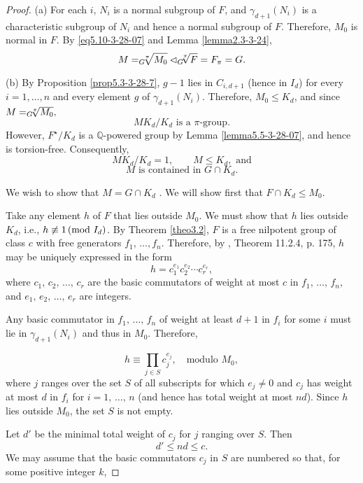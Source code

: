\documentclass[mathscr]{amsart}
\theoremstyle{theorem}
\theoremstyle{definition}
\numberwithin{equation}{section}
\newcommand{\smod}[1]{\hspace*{-.1cm}\pmod{#1}}
\def \({\left(}
\def \){\right)}
\begin{document}
\begin{proof}
\bigskip \noindent(a) For each $i$, $N_i$ is a normal subgroup of
$F$, and $\gamma_{d+1}\(N_i\)$ is a characteristic subgroup of $N_i$
and hence a normal subgroup of $F$.  Therefore, $M_0$ is normal in
$F$. By \eqref{eq5.10-3-28-07} and Lemma \ref{lemma2.3-3-24},
$$
M=_G\hspace*{-0.2cm}\sqrt[\pi]{M_0}\lhd
_G\hspace*{-0.2cm}\sqrt[\pi]F=F_\pi=G.
$$

\bigskip\noindent(b)  By Proposition \ref{prop5.3-3-28-7}, $g-1$ lies
in $C_{i,d+1}$ (hence in $I_d$) for every $i=1,\dots,n$ and every
element $g$ of $\gamma_{d+1}\(N_i\)$.  Therefore, $M_0\leq K_d$, and
since $M=_G\hspace*{-0.2cm}\sqrt[\pi]{M_0},$
$$
MK_d/K_d\text{ is a }\pi\text{-group.}
$$
However, $F^\star/K_d$ is a $\mathbb{Q}$-powered group by Lemma
\ref{lemma5.5-3-28-07}, and hence is torsion-free.  Consequently,
$$
MK_d/K_d=1,\qquad M\leq K_d,\text{ and}
$$
\begin{equation}\label{eq5.11-3-28-07}
M\text{ is contained in }G\cap K_d.
\end{equation}

We wish to show that $M=G\cap K_d$ .  We will show first that $F\cap
K_d\leq M_0$.

Take any element $h$ of $F$ that lies outside $M_0$.  We must show
that $h$ lies outside $K_d$, i.e., $h\not\equiv 1\smod{I_d}$. By
Theorem \ref{theo3.2}, $F$ is a free nilpotent group of class $c$
with free generators $f_1,\,\dots,f_n$. Therefore, by \cite{M.Hall},
Theorem 11.2.4, p. 175, $h$ may be uniquely expressed in the form
$$
h=c_1^{e_1}c_2^{e_2}\cdots c_r^{e_r},
$$
where $c_1,\,c_2,\,\dots,\,c_r$ are the basic commutators of weight
at most $c$ in $f_1,\,\dots,\,f_n,$ and $e_1,\,e_2,\,\dots,\,e_r$
are integers.

Any basic commutator in $f_1,\,\dots,\,f_n$ of weight at least $d+1$
in $f_i$ for some $i$ must lie in $\gamma_{d+1}\(N_i\)$ and thus in
$M_0$.  Therefore,

\begin{equation}\label{eq5.12-3-28-07}
h\equiv \prod_{j\in S} c_j^{e_j},\quad \text{modulo }M_0,
\end{equation}
where $j$ ranges over the set $S$ of all subscripts for which
$e_j\neq 0$ and $c_j$ has weight at most $d$ in $f_i$ for
$i=1,\,\dots,\,n$ (and hence has total weight at most $nd$).  Since
$h$ lies outside $M_0$, the set $S$ is not empty.

Let $d'$ be the minimal total weight of $c_j$ for $j$ ranging over
$S$.  Then
\begin{equation}\label{eq5.13-3-28-07}
d'\leq nd\leq c.
\end{equation}
We may assume that the basic commutators $c_j$ in $S$ are numbered
so that, for some positive integer $k$,


\end{proof}
\end{document}

